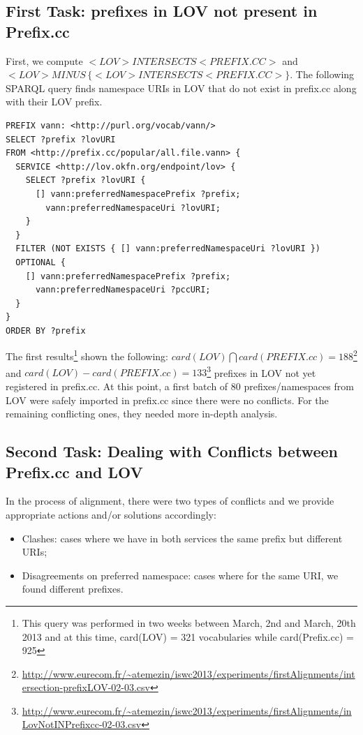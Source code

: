 \begin{description}
\subsection{First Task: prefixes in LOV not present in Prefix.cc}  \label{sec:notInPrefix}
First, we compute $<LOV> INTERSECTS <PREFIX.CC>$ and $<LOV> MINUS \, \{<LOV> INTERSECTS <PREFIX.CC> \}$. The following SPARQL query finds namespace URIs in LOV that do not exist in prefix.cc along with their LOV prefix.
\begin{verbatim}
PREFIX vann: <http://purl.org/vocab/vann/>
SELECT ?prefix ?lovURI
FROM <http://prefix.cc/popular/all.file.vann> {
  SERVICE <http://lov.okfn.org/endpoint/lov> {
    SELECT ?prefix ?lovURI {
      [] vann:preferredNamespacePrefix ?prefix;
        vann:preferredNamespaceUri ?lovURI;
    }
  }
  FILTER (NOT EXISTS { [] vann:preferredNamespaceUri ?lovURI })
  OPTIONAL {
    [] vann:preferredNamespacePrefix ?prefix;
      vann:preferredNamespaceUri ?pccURI;
  }
}
ORDER BY ?prefix
\end{verbatim}
The first results\footnote{This query was performed in two weeks between March, 2nd and March, 20th 2013 and at this time, card(LOV) = 321 vocabularies while card(Prefix.cc) = 925} shown the following: $card(LOV) \bigcap card(PREFIX.cc) = 188$\footnote{\url{http://www.eurecom.fr/~atemezin/iswc2013/experiments/firstAlignments/intersection-prefixLOV-02-03.csv}} and $card (LOV) - card( PREFIX.cc) = 133$\footnote{\url{http://www.eurecom.fr/~atemezin/iswc2013/experiments/firstAlignments/inLovNotINPrefixcc-02-03.csv}} prefixes in LOV not yet registered in prefix.cc. At this point, a first batch of $80$ prefixes/namespaces from LOV were safely imported in prefix.cc since there were no conflicts. For the remaining conflicting ones, they needed more in-depth analysis.

\subsection{Second Task: Dealing with Conflicts between Prefix.cc and LOV}  \label{sec:conflicts}
In the process of alignment, there were two types of conflicts and we provide appropriate actions and/or solutions accordingly:
\begin{itemize}
 \item Clashes: cases where we have in both services the same prefix but different URIs;
 \item Disagreements on preferred namespace: cases where for the same URI, we found different prefixes.
\end{itemize}


\end{description}
